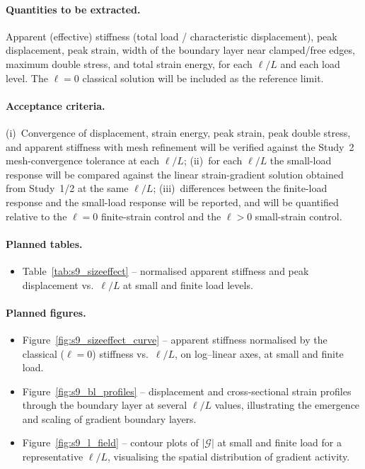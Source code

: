 \documentclass[11pt]{article}
\begin{document}
\paragraph{Quantities to be extracted.}
Apparent (effective) stiffness (total load / characteristic
displacement), peak displacement, peak strain, width of the
boundary layer near clamped/free edges, maximum double stress,
and total strain energy, for each $\ell/L$ and each load level.
The $\ell=0$ classical solution will be included as the
reference limit.

\paragraph{Acceptance criteria.}
(i)~Convergence of displacement, strain energy, peak strain,
peak double stress, and apparent stiffness with mesh
refinement will be verified against the Study~2 mesh-convergence
tolerance at each $\ell/L$; (ii)~for each $\ell/L$ the small-load
response will be compared against the linear strain-gradient
solution obtained from Study~1/2 at the same $\ell/L$;
(iii)~differences between the finite-load response and the
small-load response will be reported, and will be quantified
relative to the $\ell=0$ finite-strain control and the
$\ell>0$ small-strain control.

\paragraph{Planned tables.}
\begin{itemize}
  \item Table~\ref{tab:s9_sizeeffect} -- normalised apparent
    stiffness and peak displacement vs.\ $\ell/L$ at small and
    finite load levels.
\end{itemize}

\paragraph{Planned figures.}
\begin{itemize}
  \item Figure~\ref{fig:s9_sizeeffect_curve} -- apparent
    stiffness normalised by the classical ($\ell=0$) stiffness
    vs.\ $\ell/L$, on log--linear axes, at small and finite
    load.
  \item Figure~\ref{fig:s9_bl_profiles} -- displacement and
    cross-sectional strain profiles through the boundary layer
    at several $\ell/L$ values, illustrating the emergence
    and scaling of gradient boundary layers.
  \item Figure~\ref{fig:s9_l_field} -- contour plots of
    $|\bm{\mathcal{G}}|$ at small and finite load for a
    representative $\ell/L$, visualising the spatial
    distribution of gradient activity.
\end{itemize}
\end{document}
